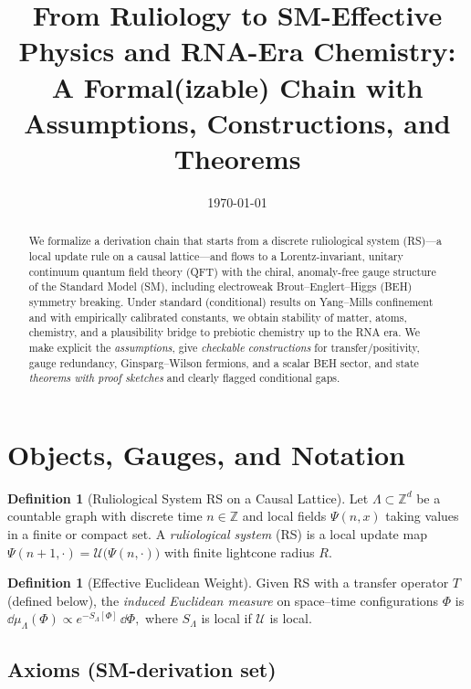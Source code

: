 \documentclass[11pt]{article}
\title{From Ruliology to SM-Effective Physics and RNA-Era Chemistry:\\
A Formal(izable) Chain with Assumptions, Constructions, and Theorems}
\author{}
\date{\today}
\theoremstyle{plain}
\theoremstyle{definition}
\newtheorem{definition}[theorem]{Definition}
\theoremstyle{remark}
\begin{document}
\maketitle

\begin{abstract}
We formalize a derivation chain that starts from a discrete ruliological system (\textsf{RS})---a local update rule on a causal lattice---and flows to a Lorentz-invariant, unitary continuum quantum field theory (QFT) with the chiral, anomaly-free gauge structure of the Standard Model (SM), including electroweak Brout--Englert--Higgs (BEH) symmetry breaking. Under standard (conditional) results on Yang--Mills confinement and with empirically calibrated constants, we obtain stability of matter, atoms, chemistry, and a plausibility bridge to prebiotic chemistry up to the RNA era. We make explicit the \emph{assumptions}, give \emph{checkable constructions} for transfer/positivity, gauge redundancy, Ginsparg--Wilson fermions, and a scalar BEH sector, and state \emph{theorems with proof sketches} and clearly flagged conditional gaps.
\end{abstract}

\tableofcontents

\section{Objects, Gauges, and Notation}

\begin{definition}[Ruliological System \textsf{RS} on a Causal Lattice]\label{def:RS}
Let $\Lambda \subset \mathbb{Z}^d$ be a countable graph with discrete time $n\in\mathbb{Z}$ and local fields $\Psi(n,x)$ taking values in a finite or compact set. A \emph{ruliological system} (\textsf{RS}) is a local update map $\Psi(n+1,\cdot)=\mathcal{U}\big(\Psi(n,\cdot)\big)$ with finite lightcone radius $R$.
\end{definition}

\begin{definition}[Effective Euclidean Weight]
Given \textsf{RS} with a transfer operator $T$ (defined below), the \emph{induced Euclidean measure} on space--time configurations $\Phi$ is
\(
\dd \mu_\Lambda(\Phi) \propto e^{-S_\Lambda[\Phi]}\,\dd \Phi,
\)
where $S_\Lambda$ is local if $\mathcal{U}$ is local.
\end{definition}

\subsection*{Axioms (SM-derivation set)}
\end{document}
